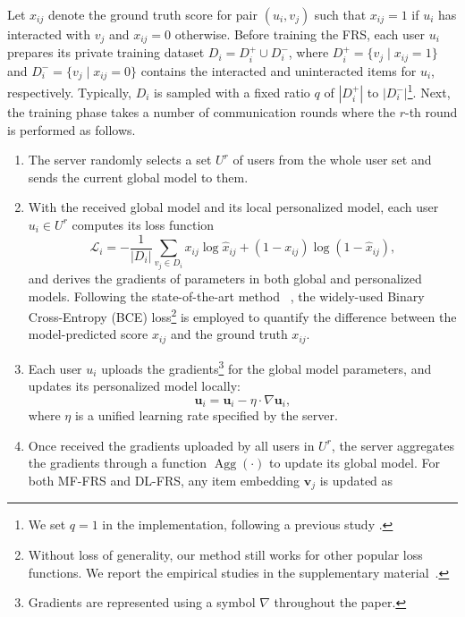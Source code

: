 Let $x_{ij}$ denote the ground truth score for pair $(u_i, v_j)$ such that $x_{ij}=1$ if $u_i$ has interacted with $v_j$ and $x_{ij}=0$ otherwise.
Before training the FRS, each user $u_i$ prepares its private training dataset ${D}_i = {D}^{+}_i \cup {D}^{-}_i$, where ${D}^{+}_i=\{v_j \mid x_{ij} =1 \}$ and ${D}^{-}_i=\{ v_j \mid x_{ij}=0 \}$ contains the interacted and uninteracted items for $u_i$, respectively.
Typically, ${D}_i$ is sampled with a fixed ratio $q$ of $|{D}^{+}_i|$ to $|{D}^{-}_i|$\footnote{We set $q=1$ in the implementation, following a previous study \cite{fedrecattack}.}.
Next, the training phase takes a number of communication rounds where the $r$-th round is performed as follows.
\begin{enumerate}[leftmargin=*]
\item The server randomly selects a set ${U}^r$ of users from the whole user set and sends the current global model to them.
\item With the received global model and its local personalized model, each user $u_i \in {U}^r$ computes its loss function
\begin{equation} \label{equation:rs-loss}
    \mathcal{L}_i =-\frac{1}{|{D}_i|}\sum_{v_j \in {D}_i} x_{ij}\log\hat{x}_{ij} + (1-x_{ij})\log(1-\hat{x}_{ij}),
\end{equation}
and derives the gradients of parameters in both global and personalized models.
Following the state-of-the-art method \AHUM{}~\cite{a-hum}, the widely-used Binary Cross-Entropy (BCE) loss\footnote{Without loss of generality, our method still works for other popular loss functions. We report the empirical studies in the supplementary material~\cite{github-pieck-supple}.} is employed to quantify the difference between the model-predicted score $\hat{x}_{ij}$ and the ground truth $x_{ij}$.
\item Each user $u_i$ uploads the gradients\footnote{Gradients are represented using a symbol $\nabla$ throughout the paper.} for the global model parameters, and updates its personalized model locally:
\begin{equation*}
\mathbf{u}_i = \mathbf{u}_i - \eta\cdot\nabla\mathbf{u}_i,
\end{equation*}
where $\eta$ is a unified learning rate specified by the server.
\item Once received the gradients uploaded by all users in ${U}^r$, the server aggregates the gradients through a function $\operatorname{Agg}(\cdot)$ to update its global model.
For both MF-FRS and DL-FRS, any item embedding $\mathbf{v}_j$ is updated as

\end{enumerate}
